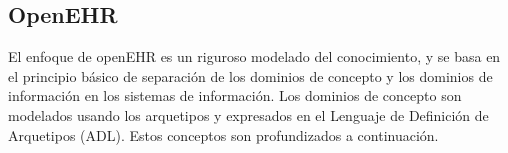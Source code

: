 \subsection{OpenEHR}

El enfoque de openEHR es un riguroso modelado del conocimiento, y se basa en el principio básico de separación de los dominios de concepto y los dominios de información en los sistemas de información. Los dominios de concepto son modelados usando los arquetipos y expresados en el Lenguaje de Definición de Arquetipos (ADL). Estos conceptos son profundizados a continuación.






